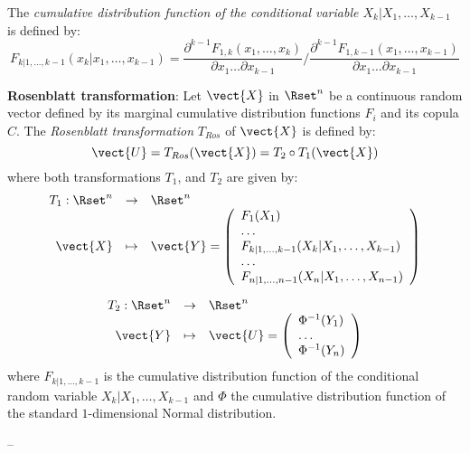 {  The \emph{cumulative distribution function of the conditional variable  $X_k|X_1, \dots, X_{k-1}$} is defined by:
  \begin{equation}
    F_{k|1, \dots, k-1} (x_k|x_1, \dots, x_{k-1})   =  \displaystyle \frac{\partial^{k-1} F_{1,k}(x_1, \dots, x_k)}{\partial x_1 \dots \partial x_{k-1}} /\frac{\partial^{k-1} F_{1,k-1}(x_1, \dots, x_{k-1})} {\partial x_1 \dots \partial x_{k-1}}
  \end{equation}

  {\bf Rosenblatt transformation}:  Let $\vect{X}$ in $\Rset^n$ be a continuous random vector defined by its marginal cumulative distribution functions $F_i$ and its  copula  $C$. The \emph{Rosenblatt transformation} $T_{Ros}$ of $\vect{X}$ is  defined by:
  \begin{equation}\label{usualRos}
    \vect{U} = T_{Ros}(\vect{X})=T_2\circ T_1(\vect{X})
  \end{equation}
  where both transformations $T_1$, and $T_2$  are given by:
  \begin{equation}\label{usualRosDetailed}
    \begin{array}{rcl}
      T_1 : \Rset^n & \rightarrow & \Rset^n\\
      \vect{X} & \mapsto & \vect{Y}=
      \left(
      \begin{array}{l}
        F_1(X_1)\\
        \dots \\
        F_{k|1, \dots, k-1}(X_k|X_1, \dots, X_{k-1})\\
        \dots \\
        F_{n|1, \dots, n-1}(X_n|X_1, \dots, X_{n-1})
      \end{array}
      \right)
    \end{array}
  \end{equation}

  \begin{equation}\label{usualRosDetailed2}
    \begin{array}{rcl}
      T_2 : \Rset^n & \rightarrow & \Rset^n\\
      \vect{Y} & \mapsto & \vect{U}=
      \left(
      \begin{array}{l}
        \Phi^{-1}(Y_1)\\
        \dots \\
        \Phi^{-1}(Y_n)
      \end{array}
      \right)
    \end{array}
  \end{equation}
  where $F_{k|1, \dots, k-1}$ is the cumulative distribution function of the conditional random variable $X_k|X_1, \dots, X_{k-1}$ and $\Phi$ the cumulative distribution function of the standard $1$-dimensional Normal distribution.\\


}
{
  --}

